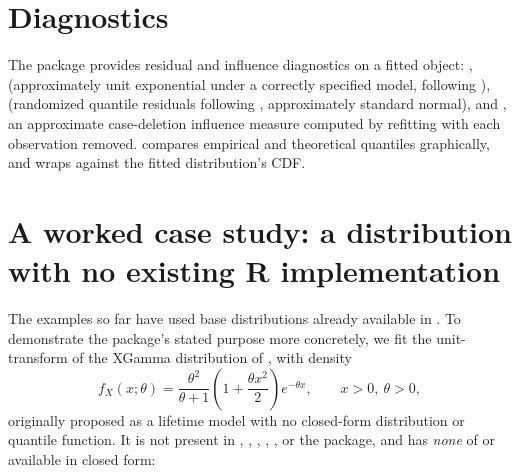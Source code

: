 \documentclass[article]{jss}
\begin{document}
\section{Diagnostics}
\label{sec:diagnostics}

The package provides residual and influence diagnostics on a fitted  object: ,  (approximately unit exponential under a correctly specified model, following \citealp{coxsnell1968}),  (randomized quantile residuals following \citealp{dunnsmyth1996}, approximately standard normal), and , an approximate case-deletion influence measure computed by refitting with each observation removed.  compares empirical and theoretical quantiles graphically, and  wraps  against the fitted distribution's CDF.

\section{A worked case study: a distribution with no existing R implementation}
\label{sec:casestudy}

The examples so far have used base distributions already available in . To demonstrate the package's stated purpose more concretely, we fit the unit-transform of the XGamma distribution of \citet{sen2016xgamma}, with density
\begin{equation}
  f_X(x;\theta) = \frac{\theta^2}{\theta+1}\left(1+\frac{\theta x^2}{2}\right)e^{-\theta x}, \qquad x>0,\ \theta>0,
  \label{eq:xgamma}
\end{equation}
originally proposed as a lifetime model with no closed-form distribution or quantile function. It is not present in , , , , , or the  package, and has \emph{none} of  or  available in closed form:

\end{document}

